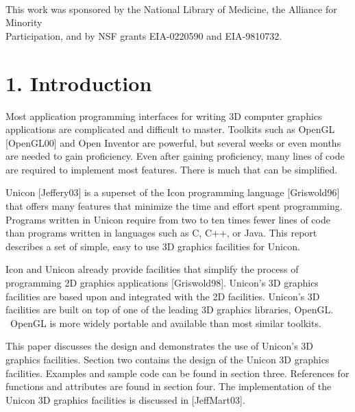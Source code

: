 \documentclass[letterpaper]{article}
\begin{document}
\ \\

\bigskip

\bigskip

\bigskip

\bigskip

\bigskip

\bigskip

{
This work was sponsored by the National Library of Medicine, the
Alliance for Minority\\ Participation, and by NSF grants
EIA-0220590 and EIA-9810732.}

\pagebreak

\section[1. Introduction]{1. Introduction}

\bigskip

{
Most application programming interfaces for writing 3D computer graphics applications are complicated and difficult to
master. Toolkits such as OpenGL [OpenGL00] and Open Inventor are powerful, but several weeks or even months are needed
to gain proficiency. Even after gaining proficiency, many lines of code are required to implement most features. There
is much that can be simplified. }

{
Unicon [Jeffery03] is a superset of the Icon programming language [Griswold96] that offers many features that minimize
the time and effort spent programming. Programs written in Unicon require from two to ten times fewer lines of code
than programs written in languages such as C, C++, or Java. This report describes a set of simple, easy to use 3D
graphics facilities for Unicon.}

{
Icon and Unicon already provide facilities that simplify the process of programming 2D graphics applications
[Griswold98]. Unicon's 3D graphics facilities are based upon and integrated with the 2D facilities. Unicon's 3D
facilities are built on top of one of the leading 3D graphics libraries, OpenGL. \ OpenGL is more widely portable and
available than most similar toolkits.}

{
This paper discusses the design and demonstrates the use of Unicon's 3D graphics facilities. Section two contains the
design of the Unicon 3D graphics facilities. Examples and sample code can be found in section three. References for
functions and attributes are found in section four. The implementation of the Unicon 3D graphics facilities is
discussed in [JeffMart03].}
\end{document}
